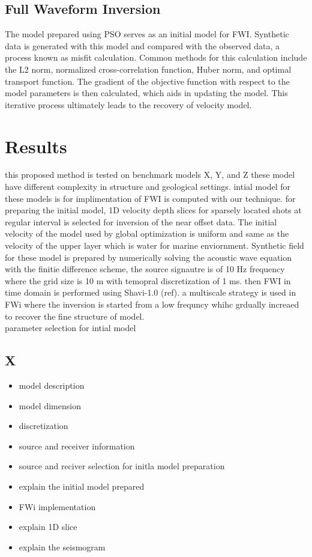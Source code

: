 \documentclass[paper,revised]{geophysics}
\begin{document}
\subsection{Full Waveform Inversion}
The model prepared using PSO serves as an initial model for FWI. Synthetic data is generated with this model and compared with the observed data, a process known as misfit calculation. Common methods for this calculation include the L2 norm, normalized cross-correlation function, Huber norm, and optimal transport function. The gradient of the objective function with respect to the model parameters is then calculated, which aids in updating the model. This iterative process ultimately leads to the recovery of velocity model.
\label{method}

\section{Results}
this proposed method is tested on benchmark models  X, Y, and Z these model have different complexity in structure and geological settings. intial model for these models is for implimentation of FWI is computed with our technique.  for preparing the initial model, 1D velocity depth slices for sparsely located shots at regular interval is selected for inversion of the near offset data. The initial velocity of the model used by global optimization is uniform and same as the velocity of the upper layer which is water for marine enviornment. Synthetic field for these model is prepared by numerically solving the acoustic wave equation with the finitie difference scheme, the source signautre is of 10 Hz frequency where the grid size is 10 m with temopral discretization of 1 ms. then FWI in time domain is performed using Shavi-1.0 (ref). a multiscale strategy is used in FWi where the inversion is started from a low frequncy whihc grdually increaed to recover the fine structure of model.
\\
parameter selection for intial model
\subsection{X}
\begin{itemize}
	\item model description
	\item model dimension
	\item discretization
	\item source and receiver information
	\item source and reciver selection for initla model preparation
	\item explain the initial model prepared
	\item FWi implementation
	\item explain 1D slice
	\item explain the seismogram
\end{itemize}
\end{document}
